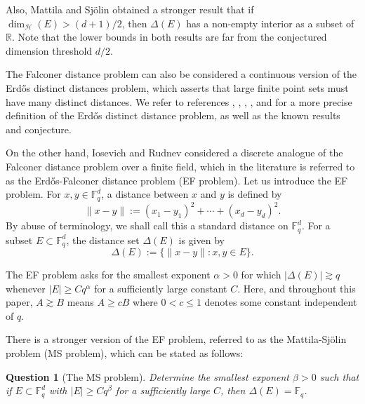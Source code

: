 \documentclass[a4paper,11pt]{amsart}
\numberwithin{equation}{section}
\newtheorem{question}[theorem]{Question}
\def\Fq#1{\mathbb{F}_q^{#1}}
\begin{document}
Also, Mattila and Sj\"{o}lin \cite{MS99} obtained a stronger result that if $ \dim_{\mathcal{H}}(E) > (d+1)/2 $, then $ \Delta(E) $  has a non-empty interior as a subset of $\mathbb R$. Note that the lower bounds in both results are far from the conjectured dimension threshold $d/2$.

The Falconer distance problem can also be considered a continuous version of the Erd\H{o}s distinct distances problem, which asserts that large finite point sets must have many distinct distances. We refer to references \cite{BKT}, \cite{Er46}, \cite{GK10}, \cite{KT04}, and \cite{SV08} for a more precise definition of the Erd\H{o}s distinct distance problem, as well as the known results and conjecture. 


On the other hand, Iosevich and Rudnev \cite{IR07} considered a discrete analogue of the Falconer distance problem over a finite field, 
which in the literature is referred to as the Erd\H{o}s-Falconer distance problem (EF problem). Let us introduce the EF problem. For  $x, y\in \Fq{d}$, a distance between $x$ and $y$ is defined by
\begin{equation*}
\|x - y\| := (x_1 - y_1)^2 + \cdots + (x_d - y_d)^2.
\end{equation*}
By abuse of terminology, we shall call this a standard distance on $\Fq{d}$. For a subset $E \subset \Fq{d}$, the  distance set $\Delta(E)$ is given by
\begin{equation}\label{Emetric}
\Delta(E) := \{\|x - y\| : x, y \in E \}.
\end{equation}

The EF problem asks for the smallest exponent $\alpha>0$ for which $|\Delta(E)| \gtrsim q$ whenever $|E| \geq Cq^\alpha$ for a sufficiently large constant $C$. Here, and throughout this paper, $A \gtrsim B$ means $A \geq cB$ where $0 < c \leq 1$ denotes some constant independent of $q$.

There is a stronger version of the EF problem, referred to as the Mattila-Sj\"{o}lin problem (MS problem), which can be stated as follows:
\begin{question}[The MS problem]\label{Q1}
    Determine the smallest exponent $\beta > 0$ such that if $E\subset \mathbb F_q^d$ with $|E| \geq Cq^{\beta}$ for a sufficiently large $C$, then $\Delta(E) = \Fq{}$.
\end{question}
\end{document}
